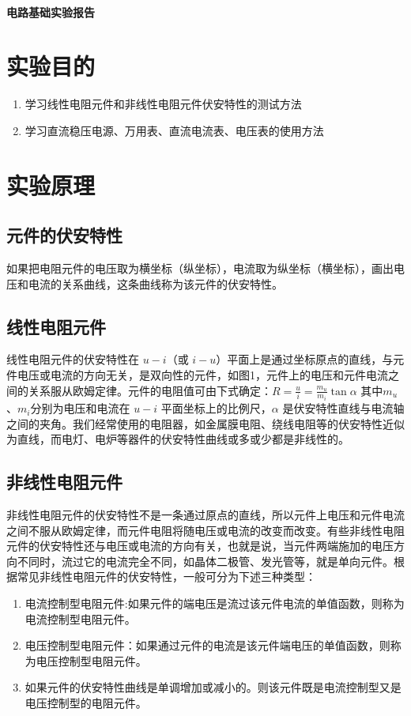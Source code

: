 \documentclass[a4paper,utf8]{article}
\begin{document}
\begin{center}
    {\mbox{}\\[7em]\bfseries\songti%
    电路基础实验报告}\\[34mm]
    \pointingbox
\end{center}
\newpage
\section{实验目的}
\begin{enumerate}
    \item 学习线性电阻元件和非线性电阻元件伏安特性的测试方法
    \item 学习直流稳压电源、万用表、直流电流表、电压表的使用方法
\end{enumerate}

\section{实验原理}%
    \subsection{元件的伏安特性}
        如果把电阻元件的电压取为横坐标（纵坐标），电流取为纵坐标（横坐标），画出电压和电流的关系曲线，这条曲线称为该元件的伏安特性。

    \subsection{线性电阻元件}
        线性电阻元件的伏安特性在 $u-i$（或 $i-u$）平面上是通过坐标原点的直线，与元件电压或电流的方向无关，是双向性的元件，如图1，元件上的电压和元件电流之间的关系服从欧姆定律。元件的电阻值可由下式确定：$\displaystyle R=\frac{u}{i}=\frac{m_u}{m_i}\tan{\alpha}$ 其中$m_u$、$m_i$分别为电压和电流在 $u-i$ 平面坐标上的比例尺，$\alpha$ 是伏安特性直线与电流轴之间的夹角。我们经常使用的电阻器，如金属膜电阻、绕线电阻等的伏安特性近似为直线，而电灯、电炉等器件的伏安特性曲线或多或少都是非线性的。
    
    \subsection{非线性电阻元件}
        非线性电阻元件的伏安特性不是一条通过原点的直线，所以元件上电压和元件电流之间不服从欧姆定律，而元件电阻将随电压或电流的改变而改变。有些非线性电阻元件的伏安特性还与电压或电流的方向有关，也就是说，当元件两端施加的电压方向不同时，流过它的电流完全不同，如晶体二极管、发光管等，就是单向元件。根据常见非线性电阻元件的伏安特性，一般可分为下述三种类型：
        \begin{enumerate}
            \item 电流控制型电阻元件:如果元件的端电压是流过该元件电流的单值函数，则称为电流控制型电阻元件。
            \item 电压控制型电阻元件：如果通过元件的电流是该元件端电压的单值函数，则称为电压控制型电阻元件。
            \item 如果元件的伏安特性曲线是单调增加或减小的。则该元件既是电流控制型又是电压控制型的电阻元件。
        \end{enumerate}
\end{document}
